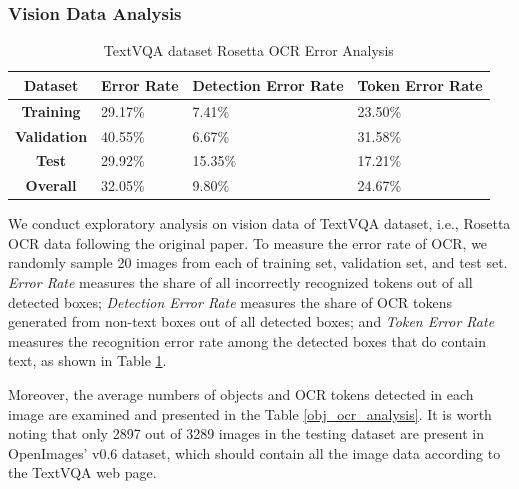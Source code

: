 \subsubsection{Vision Data Analysis}

\begin{table}[h]
\caption{TextVQA dataset Rosetta OCR Error Analysis}
\label{ocr_error_analysis}
    \begin{center}
        \begin{tabularx}{\linewidth}{c|X X X}
            \hline
            \textbf{Dataset} & Error Rate & Detection Error Rate & Token Error Rate \\\hline
            \textbf{Training} & 29.17\% & 7.41\% & 23.50\% \\
            \textbf{Validation} & 40.55\% & 6.67\% & 31.58\% \\
            \textbf{Test} & 29.92\% & 15.35\% & 17.21\% \\
            \hline
            \textbf{Overall} & 32.05\% & 9.80\% & 24.67\% \\
            \hline
        \end{tabularx}
    \end{center}
\end{table}

We conduct exploratory analysis on vision data of TextVQA dataset, i.e., Rosetta OCR data following the original paper. To measure the error rate of OCR, we randomly sample 20 images from each of training set, validation set, and test set. \textit{Error Rate} measures the share of all incorrectly recognized tokens out of all detected boxes; \textit{Detection Error Rate} measures the share of OCR tokens generated from non-text boxes out of all detected boxes; and \textit{Token Error Rate} measures the recognition error rate among the detected boxes that do contain text, as shown in Table \ref{ocr_error_analysis}.

Moreover, the average numbers of objects and OCR tokens detected in each image are examined and presented in the Table \ref{obj_ocr_analysis}. It is worth noting that only 2897 out of 3289 images in the testing dataset are present in OpenImages' v0.6 dataset, which should contain all the image data according to the TextVQA web page.


